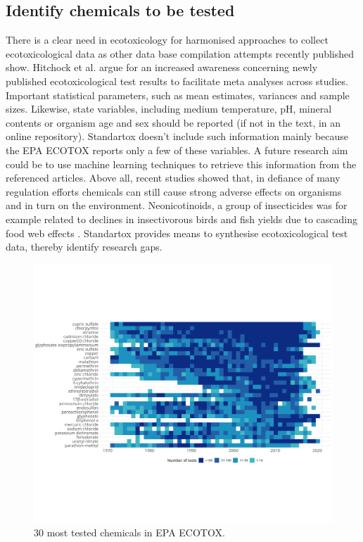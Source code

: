 \subsection*{Identify chemicals to be tested}
There is a clear need in ecotoxicology for harmonised approaches to collect ecotoxicological data as other data base compilation attempts recently published show. Hitchock et al. \citet{hitchcock_improving_2018} argue for an increased awareness concerning newly published ecotoxicological test results to facilitate meta analyses across studies. Important statistical parameters, such as mean estimates, variances and sample sizes. Likewise, state variables, including medium temperature, pH, mineral contents or organism age and sex should be reported (if not in the text, in an online repository). Standartox doesn't include such information mainly because the EPA ECOTOX reports only a few of these variables. A future research aim could be to use machine learning techniques to retrieve this information from the referenced articles.
Above all, recent studies showed that, in defiance of many regulation efforts \citep{schafer_future_2019} chemicals can still cause strong adverse effects on organisms and in turn on the environment. Neonicotinoids, a group of insecticides was for example related to declines in insectivorous birds \citep{hallmann_declines_2014} and fish yields due to cascading food web effects \citep{yamamuro_neonicotinoids_2019}. Standartox provides means to synthesise ecotoxicological test data, thereby identify research gaps. 

\begin{figure}
    \includegraphics[width=1\linewidth]{article/figures/heatmap_tests_n.png}
    \caption{30 most tested chemicals in EPA ECOTOX.}
    \label{fig:standartox_ppdb_diff}
\end{figure}



\fi
